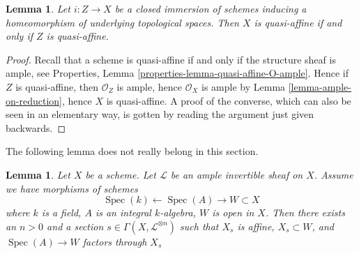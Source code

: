 \documentclass{stacks-project}
\theoremstyle{plain}
\newtheorem{lemma}[subsection]{Lemma}
\theoremstyle{definition}
\theoremstyle{remark}
\numberwithin{equation}{subsection}
\def\Spec{\mathop{\mathrm{Spec}}}
\begin{document}
\begin{lemma}
\label{lemma-thickening-quasi-affine}
Let $i : Z \to X$ be a closed immersion of schemes
inducing a homeomorphism of underlying topological spaces.
Then $X$ is quasi-affine if and only if $Z$ is quasi-affine.
\end{lemma}

\begin{proof}
Recall that a scheme is quasi-affine
if and only if the structure sheaf is ample, see
Properties, Lemma \ref{properties-lemma-quasi-affine-O-ample}.
Hence if $Z$ is quasi-affine, then $\mathcal{O}_Z$ is ample,
hence $\mathcal{O}_X$ is ample by
Lemma \ref{lemma-ample-on-reduction}, hence
$X$ is quasi-affine. A proof of the converse, which
can also be seen in an elementary way, is gotten by
reading the argument just given backwards.
\end{proof}

\noindent
The following lemma does not really belong in this section.

\begin{lemma}
\label{lemma-ample-profinite-set-in-principal-affine}
Let $X$ be a scheme. Let $\mathcal{L}$ be an ample invertible sheaf on $X$.
Assume we have morphisms of schemes
$$
\Spec(k) \leftarrow \Spec(A) \to W \subset X
$$
where $k$ is a field, $A$ is an integral $k$-algebra, $W$ is open in $X$.
Then there exists an $n > 0$ and a section
$s \in \Gamma(X, \mathcal{L}^{\otimes n})$ such that
$X_s$ is affine, $X_s \subset W$, and $\Spec(A) \to W$ factors through $X_s$
\end{lemma}
\end{document}
